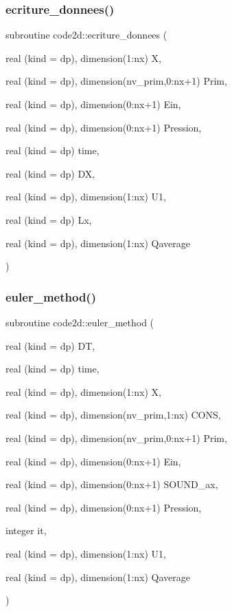 \subsubsection{\texorpdfstring{ecriture\+\_\+donnees()}{ecriture\_donnees()}}
{\footnotesize\ttfamily subroutine code2d\+::ecriture\+\_\+donnees (\begin{DoxyParamCaption}\item[{real (kind = dp), dimension(1\+:nx)}]{X,  }\item[{real (kind = dp), dimension(nv\+\_\+prim,0\+:nx+1)}]{Prim,  }\item[{real (kind = dp), dimension(0\+:nx+1)}]{Ein,  }\item[{real (kind = dp), dimension(0\+:nx+1)}]{Pression,  }\item[{real (kind = dp)}]{time,  }\item[{real (kind = dp)}]{DX,  }\item[{real (kind = dp), dimension(1\+:nx)}]{U1,  }\item[{real (kind = dp)}]{Lx,  }\item[{real (kind = dp), dimension(1\+:nx)}]{Qaverage }\end{DoxyParamCaption})}

\mbox{\label{main1DOr2_8f90_a61ef0ae28fb906748d601350a093a3fa}} 
\subsubsection{\texorpdfstring{euler\+\_\+method()}{euler\_method()}}
{\footnotesize\ttfamily subroutine code2d\+::euler\+\_\+method (\begin{DoxyParamCaption}\item[{real (kind = dp)}]{DT,  }\item[{real (kind = dp)}]{time,  }\item[{real (kind = dp), dimension(1\+:nx)}]{X,  }\item[{real (kind = dp), dimension(nv\+\_\+prim,1\+:nx)}]{C\+O\+NS,  }\item[{real (kind = dp), dimension(nv\+\_\+prim,0\+:nx+1)}]{Prim,  }\item[{real (kind = dp), dimension(0\+:nx+1)}]{Ein,  }\item[{real (kind = dp), dimension(0\+:nx+1)}]{S\+O\+U\+N\+D\+\_\+ax,  }\item[{real (kind = dp), dimension(0\+:nx+1)}]{Pression,  }\item[{integer}]{it,  }\item[{real (kind = dp), dimension(1\+:nx)}]{U1,  }\item[{real (kind = dp), dimension(1\+:nx)}]{Qaverage }\end{DoxyParamCaption})}

